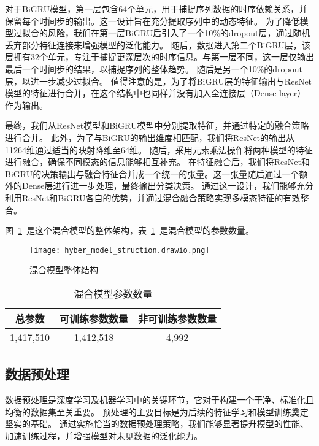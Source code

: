 对于BiGRU模型，第一层包含64个单元，用于捕捉序列数据的时序依赖关系，并保留每个时间步的输出。这一设计旨在充分提取序列中的动态特征。
为了降低模型过拟合的风险，我们在第一层BiGRU后引入了一个10\%的dropout层，通过随机丢弃部分特征连接来增强模型的泛化能力。
随后，数据进入第二个BiGRU层，该层拥有32个单元，专注于捕捉更深层次的时序信息。与第一层不同，这一层仅输出最后一个时间步的结果，以捕捉序列的整体趋势。
随后是另一个10\%的dropout层，以进一步减少过拟合。
值得注意的是，为了将BiGRU层的特征输出与ResNet模型的特征进行合并，在这个结构中也同样并没有加入全连接层（Dense layer）作为输出。\par


最终，我们从ResNet模型和BiGRU模型中分别提取特征，并通过特定的融合策略进行合并。
此外，为了与BiGRU的输出维度相匹配，我们将ResNet的输出从11264维通过适当的映射降维至64维。
随后，采用元素乘法操作将两种模型的特征进行融合，确保不同模态的信息能够相互补充。
在特征融合后，我们将ResNet和BiGRU的决策输出与融合特征合并成一个统一的张量。这一张量随后通过一个额外的Dense层进行进一步处理，最终输出分类决策。
通过这一设计，我们能够充分利用ResNet和BiGRU各自的优势，并通过混合融合策略实现多模态特征的有效整合。

图~\ref{fig:hyber_model_struct}~是这个混合模型的整体架构，表~\ref{tab:model_params}~是混合模型的参数数量。
\begin{figure}[h]
	\centering
	\texttt{[image: hyber\_model\_struction.drawio.png]}
	\caption{混合模型整体结构}
	\label{fig:hyber_model_struct}
\end{figure}



\begin{table}[h]
	\caption{混合模型参数数量}
	\label{tab:model_params}
	\centering
	\begin{tabular}{ccc}
		\toprule
		\textbf{总参数} & \textbf{可训练参数数量} & \textbf{非可训练参数数量} \\
		\midrule
		1,417,510    & 1,412,518        & 4,992             \\
		\bottomrule
	\end{tabular}
\end{table}
\subsection{数据预处理}
数据预处理是深度学习及机器学习中的关键环节，它对于构建一个干净、标准化且均衡的数据集至关重要。
预处理的主要目标是为后续的特征学习和模型训练奠定坚实的基础。
通过实施恰当的数据预处理策略，我们能够显著提升模型的性能、加速训练过程，并增强模型对未见数据的泛化能力。\par

